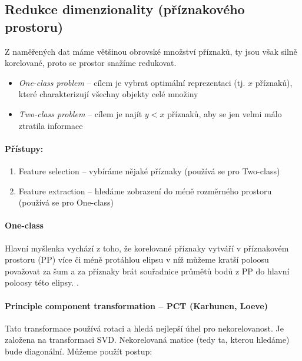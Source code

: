 

\subsection{Redukce dimenzionality (příznakového prostoru)}
Z naměřených dat máme většinou obrovské množství příznaků, ty jsou však silně korelované, proto se prostor 
snažíme redukovat.

\begin{itemize}
\item {\em One-class problem} -- cílem je vybrat optimální reprezentaci (tj. $x$ příznaků), které charakterizují 
všechny objekty celé množiny
\item {\em Two-class problem} -- cílem je najít $y<x$ příznaků, aby se jen velmi málo ztratila informace
\end{itemize}

\paragraph{Přístupy:}
\begin{enumerate}
\item Feature selection -- vybíráme nějaké příznaky (používá se pro Two-class)
\item Feature extraction -- hledáme zobrazení do méně rozměrného prostoru (používá se pro One-class)
\end{enumerate}

\paragraph{One-class}

Hlavní myšlenka vychází z toho, že korelované příznaky vytváří v příznakovém prostoru (PP) více či méně protáhlou
elipsu v níž můžeme kratší poloosu považovat za šum a za příznaky brát souřadnice průmětů bodů z PP do hlavní poloosy
této elipsy.
.

\paragraph{Principle component transformation -- PCT (Karhunen, Loeve)}
Tato transformace používá rotaci a hledá nejlepší úhel pro nekorelovanost. 
Je založena  na transformaci SVD. Nekorelovaná matice (tedy ta, kterou hledáme) bude diagonální. Můžeme použít postup:

